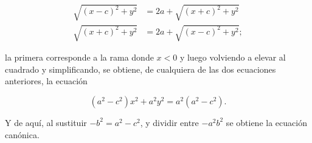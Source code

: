 \documentclass{article}
\theoremstyle{definicion}
\theoremstyle{definition}             %
\theoremstyle{definition}             %
\theoremstyle{definition}
\theoremstyle{definition}
\theoremstyle{observacion}
\theoremstyle{definition}
\theoremstyle{plain}
\theoremstyle{definition}
\theoremstyle{afirmacion}
\theoremstyle{notation}
\theoremstyle{definition}
\begin{document}
    \begin{align*}
        \sqrt{(x - c)^{2} + y^{2}} &= 2a + \sqrt{(x + c)^{2} + y^{2}} \\
        \sqrt{(x + c)^{2} + y^{2}} &= 2a + \sqrt{(x - c)^{2} + y^{2}};
    \end{align*}

    la primera corresponde a la rama donde \(x < 0\) y luego volviendo a elevar al cuadrado y simplificando, se obtiene, de cualquiera de las dos ecuaciones anteriores, la ecuación 

    \begin{equation*}
        (a^{2} - c^{2})x^{2} + a^{2}y^{2} = a^{2}(a^{2} - c^{2}).
    \end{equation*}

    Y de aquí, al sustituir \(-b^{2} = a^{2} - c^{2}\), y dividir entre \(-a^{2}b^{2}\) se obtiene la ecuación canónica.
\end{document}
